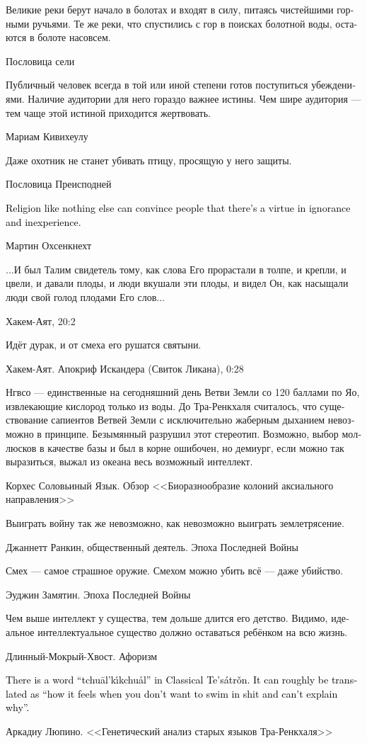 \documentclass[a4paper,12pt,fleqn]{book}\usepackage{cooltooltips}\usepackage{polyglossia}\setdefaultlanguage[babelshorthands=true]{russian}\setotherlanguage{english}\defaultfontfeatures{Ligatures=TeX,Mapping=tex-text} \usepackage{xcolor}\definecolor{lightgray}{HTML}{bbbbbb}\color{lightgray}\newcommand{\ml}[3]{\textenglish{\textcolor{black}{#3}}}
\begin{document}
{\epigraph
{Великие реки берут начало в болотах и входят в силу, питаясь чистейшими горными ручьями.
Те же реки, что спустились с гор в поисках болотной воды, остаются в болоте насовсем.}
{Пословица сели}

\epigraph
{Публичный человек всегда в той или иной степени готов поступиться убеждениями.
Наличие аудитории для него гораздо важнее истины.
Чем шире аудитория --- тем чаще этой истиной приходится жертвовать.}
{Мариам Кивихеулу}

\epigraph
{Даже охотник не станет убивать птицу, просящую у него защиты.}
{Пословица Преисподней}

\epigraph{
\ml{$0$}
{Религия как ничто другое умеет убеждать людей, что неумение и незнание есть добродетели.}
{Religion like nothing else can convince people that there's a virtue in ignorance and inexperience.}
}{
Мартин Охсенкнехт
}

\epigraph
{...И был Талим свидетель тому, как слова Его прорастали в толпе, и крепли, и цвели, и давали плоды, и люди вкушали эти плоды, и видел Он, как насыщали люди свой голод плодами Его слов...}
{Хакем-Аят, 20:2}

\epigraph
{Идёт дурак, и от смеха его рушатся святыни.}
{Хакем-Аят. Апокриф Искандера (Свиток Ликана), 0:28}

\epigraph
{Нгвсо --- единственные на сегодняшний день Ветви Земли со 120 баллами по Яо, извлекающие кислород только из воды.
До Тра-Ренкхаля считалось, что существование сапиентов Ветвей Земли с исключительно жаберным дыханием невозможно в принципе.
Безымянный разрушил этот стереотип.
Возможно, выбор моллюсков в качестве базы и был в корне ошибочен, но демиург, если можно так выразиться, выжал из океана весь возможный интеллект.}
{Корхес Соловьиный Язык.
Обзор <<Биоразнообразие колоний аксиального направления>>}

\epigraph
{Выиграть войну так же невозможно, как невозможно выиграть землетрясение.}
{Джаннетт Ранкин, общественный деятель.
Эпоха Последней Войны}

\epigraph
{Смех --- самое страшное оружие.
Смехом можно убить всё --- даже убийство.}
{Эуджин Замятин.
Эпоха Последней Войны}

\epigraph
{Чем выше интеллект у существа, тем дольше длится его детство.
Видимо, идеальное интеллектуальное существо должно оставаться ребёнком на всю жизнь.}
{Длинный-Мокрый-Хвост.
Афоризм}

\epigraph{
\ml{$0$}
{В классическом цатроне есть слово <<тхвал'кикхвал>>.}
{There is a word ``tchu\={a}l'k\'{\i}kchu\r{a}l'' in Classical Te's\'{a}tr\v{o}n.}
\ml{$0$}
{Оно приблизительно переводится как <<что испытывает тот, кто не хочет плавать в дерьме, но не может объяснить почему>>.}
{It can roughly be translated as ``how it feels when you don't want to swim in shit and can't explain why''.}
}{
Аркадиу Люпино.
<<Генетический анализ старых языков Тра-Ренкхаля>>
}

}
\end{document}
